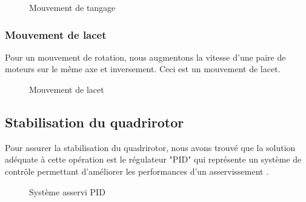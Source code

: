 \begin{figure}[H] 
\begin{center}
	\centering
\end{center}
\caption{Mouvement de tangage}
\end{figure}

\subsubsection{Mouvement de lacet}
Pour un mouvement de rotation, nous augmentons la vitesse d'une paire de moteurs sur le même axe et inversement. Ceci est un mouvement de lacet.
\begin{figure} [H]
\begin{center}
\end{center}
\caption{Mouvement de lacet}	
\end{figure}
\subsection {Stabilisation du quadrirotor}
Pour assurer la stabilisation du quadrirotor, nous avons trouvé que la solution adéquate à cette opération est le régulateur "PID" qui représente un système de contrôle permettant d’améliorer les performances d'un asservissement \cite{Wikipideab}.
\begin{figure}[H] 
\begin{center}
	\centering
\end{center}
\caption{Système asservi PID}
\end{figure}

